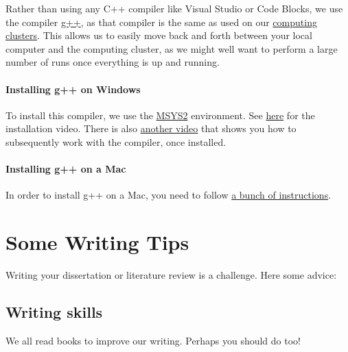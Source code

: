 \documentclass[
]{book}
\begin{document}
Rather than using any C++ compiler like Visual Studio or Code Blocks, we use the compiler \href{https://gcc.gnu.org/}{g++}, as that compiler is the same as used on our \href{https://universityofexeteruk.sharepoint.com/sites/CornwallARC}{computing clusters}. This allows us to easily move back and forth between your local computer and the computing cluster, as we might well want to perform a large number of runs once everything is up and running.

\hypertarget{installing-g-on-windows}{%
\subsubsection{Installing g++ on Windows}\label{installing-g-on-windows}}

To install this compiler, we use the \href{https://www.msys2.org/}{MSYS2} environment. See \href{https://recapexeter.cloud.panopto.eu/Panopto/Pages/Viewer.aspx?id=f2acdf3c-224e-49be-8ae3-ad2400f2b3c1\&start=0}{here} for the installation video. There is also \href{https://recapexeter.cloud.panopto.eu/Panopto/Pages/Viewer.aspx?id=376342e6-5791-4c25-b2e3-ad2400ffe304\&start=0}{another video} that shows you how to subsequently work with the compiler, once installed.

\hypertarget{installing-g-on-a-mac}{%
\subsubsection{Installing g++ on a Mac}\label{installing-g-on-a-mac}}

In order to install g++ on a Mac, you need to follow \href{https://www.freecodecamp.org/news/install-xcode-command-line-tools/}{a bunch of instructions}.

\hypertarget{some-writing-tips}{%
\chapter{Some Writing Tips}\label{some-writing-tips}}

Writing your dissertation or literature review is a challenge. Here some advice:

\hypertarget{writing-skills}{%
\section{Writing skills}\label{writing-skills}}

We all read books to improve our writing. Perhaps you should do too!
\end{document}
